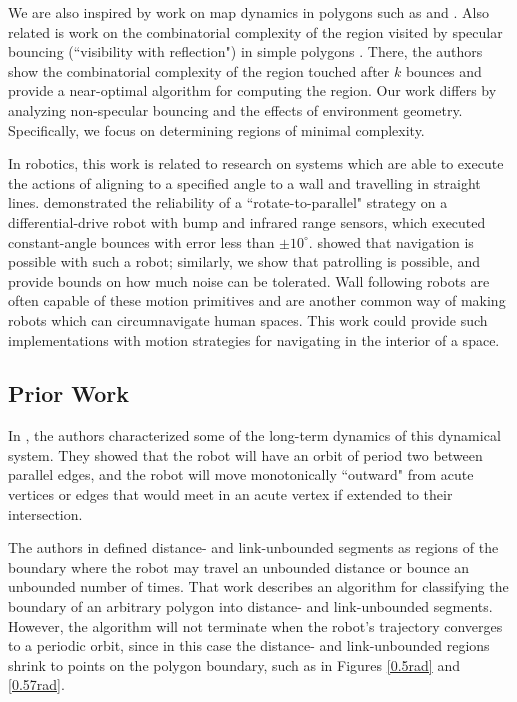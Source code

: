 \documentclass[letterpaper, 10 pt, conference]{ieeeconf}  %
\begin{document}
We are also inspired by work on map dynamics in polygons such as
\cite{schwartz_billiards} and \cite{schwartz1992}. Also related is work on the
combinatorial complexity of the region visited
by specular bouncing (``visibility with reflection") in simple polygons
\cite{Aronov1996}. There, the authors show the combinatorial complexity of the
region touched after $k$ bounces and provide a near-optimal algorithm for
computing the region. Our work differs by analyzing non-specular bouncing and
the effects of environment geometry. Specifically, we focus on determining
regions of minimal complexity.

In robotics, this work is related to research on systems which are able to execute the
actions of aligning to a specified angle to a wall and travelling in straight
lines. \cite{LewOKa13} demonstrated the reliability of a
``rotate-to-parallel" strategy on a differential-drive robot with bump and
infrared range sensors, which executed
constant-angle bounces with error less than $\pm 10^{\circ}$. 
\cite{LewOKa13} showed that navigation is possible with such a robot; similarly,
we show that patrolling is possible, and provide bounds on how much noise can be
tolerated. Wall following robots \cite{Carelli2003,Lamp05} are often capable of these
motion primitives and are another common way of making robots which can
circumnavigate human spaces. This work could provide such
implementations with motion strategies for navigating in the interior of a space.

\subsection{Prior Work}

In \cite{bounce}, the authors
characterized some of the long-term dynamics of this dynamical system. They
showed that the robot will have an orbit of period two between parallel edges,
and the robot will move monotonically ``outward" from acute vertices or edges
that would meet in an acute vertex if extended to their intersection.

The authors in \cite{bounce} defined distance- and link-unbounded
segments as regions of the boundary where the robot may
travel an unbounded distance or bounce an unbounded number of times. That work describes an algorithm for classifying the
 boundary of an arbitrary polygon into distance- and link-unbounded segments. 
 However, the algorithm will not terminate when the robot's trajectory converges 
 to a periodic orbit, since in this case the distance- and link-unbounded regions shrink to points on the polygon boundary, such as in Figures \ref{0.5rad} and \ref{0.57rad}.
\end{document}
